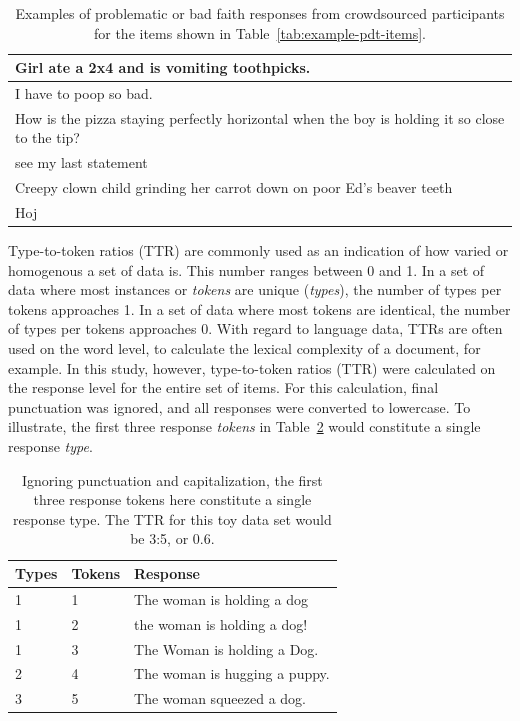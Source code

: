 \begin{table}[htb!]
\begin{center}
\begin{tabular}{|l|}
\hline
Girl ate a 2x4 and is vomiting toothpicks. \\
\hline
I have to poop so bad. \\
\hline
How is the pizza staying perfectly horizontal when the boy is holding it so close to the tip? \\
\hline
see my last statement \\
\hline
Creepy clown child grinding her carrot down on poor Ed's beaver teeth \\
\hline
Hoj \\
\hline
\end{tabular}
\caption{\label{tab:bad-faith} Examples of problematic or bad faith responses from crowdsourced participants for the items shown in Table~\ref{tab:example-pdt-items}.}
\end{center}
\end{table}


Type-to-token ratios (TTR) are commonly used as an indication of how varied or homogenous a set of data is. This number ranges between 0 and 1.  In a set of data where most instances or \textit{tokens} are unique (\textit{types}), the number of types per tokens approaches 1. In a set of data where most tokens are identical, the number of types per tokens approaches 0. With regard to language data, TTRs are often used on the word level, to calculate the lexical complexity of a document, for example. In this study, however, type-to-token ratios (TTR) were calculated on the response level for the entire set of items. For this calculation, final punctuation was ignored, and all responses were converted to lowercase. To illustrate, the first three response \textit{tokens} in Table~\ref{tab:type-token-examples} would constitute a single response \textit{type}.

\begin{table}[htb!]
\begin{center}
\begin{tabular}{|l|l|l|}
\hline
Types & Tokens & Response \\
\hline
1 & 1 & The woman is holding a dog \\
\hline
1 & 2 & the woman is holding a dog! \\
\hline
1 & 3 & The Woman is holding a Dog. \\
\hline
2 & 4 & The woman is hugging a puppy. \\
\hline
3 & 5 & The woman squeezed a dog. \\
\hline
\end{tabular}
\caption{\label{tab:type-token-examples} Ignoring punctuation and capitalization, the first three response tokens here constitute a single response type. The TTR for this toy data set would be 3:5, or 0.6.}
\end{center}
\end{table}

